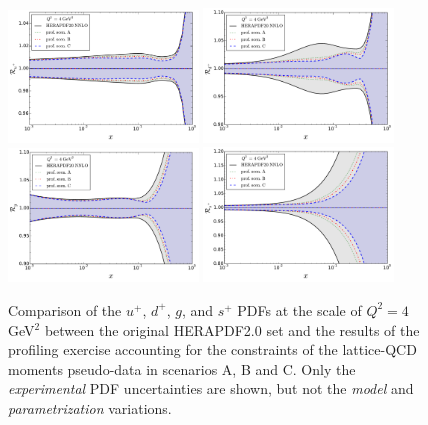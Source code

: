 \begin{figure}[!t]
\centering
\includegraphics[width=0.45\textwidth]{plots/ratio_uPubar_Q2.pdf}
\includegraphics[width=0.45\textwidth]{plots/ratio_dPdbar_Q2.pdf}\\
\includegraphics[width=0.45\textwidth]{plots/ratio_g_Q2.pdf}
\includegraphics[width=0.45\textwidth]{plots/ratio_sPsbar_Q2.pdf}
\caption{\small Comparison
of the $u^+$, $d^+$, $g$, and $s^+$ PDFs at the scale of $Q^2=4$ GeV$^2$
between the original  HERAPDF2.0 set and the results of the profiling
exercise accounting for the constraints of
the lattice-QCD moments
pseudo-data in scenarios A, B and C.
%
Only the {\it experimental} PDF uncertainties are shown,
but not the {\it model} and {\it parametrization} variations.
}
\label{fig:pdfsProf}
\end{figure}

